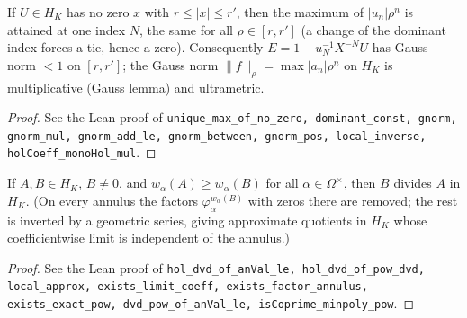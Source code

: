 \begin{lemma}
\label{lem:dominant-annulus}
\leanok
If $U\in H_K$ has no zero $x$ with $r\le|x|\le r'$, then the maximum of $|u_n|\rho^n$ is attained at one index $N$, the same for all $\rho\in[r,r']$ (a change of the dominant index forces a tie, hence a zero). Consequently $E=1-u_N^{-1}X^{-N}U$ has Gauss norm $<1$ on $[r,r']$; the Gauss norm $\|f\|_\rho=\max|a_n|\rho^n$ on $H_K$ is multiplicative (Gauss lemma) and ultrametric.
\end{lemma}
\begin{proof}
\leanok
See the Lean proof of \texttt{unique\_max\_of\_no\_zero, dominant\_const, gnorm, gnorm\_mul, gnorm\_add\_le, gnorm\_between, gnorm\_pos, local\_inverse, holCoeff\_monoHol\_mul}.
\end{proof}

\begin{theorem}
\label{thm:division-hol}
\leanok
If $A,B\in H_K$, $B\ne0$, and $w_\alpha(A)\ge w_\alpha(B)$ for all $\alpha\in\Omega^\times$, then $B$ divides $A$ in $H_K$. (On every annulus the factors $\varphi_\alpha^{w_\alpha(B)}$ with zeros there are removed; the rest is inverted by a geometric series, giving approximate quotients in $H_K$ whose coefficientwise limit is independent of the annulus.)
\end{theorem}
\begin{proof}
\leanok
See the Lean proof of \texttt{hol\_dvd\_of\_anVal\_le, hol\_dvd\_of\_pow\_dvd, local\_approx, exists\_limit\_coeff, exists\_factor\_annulus, exists\_exact\_pow, dvd\_pow\_of\_anVal\_le, isCoprime\_minpoly\_pow}.
\end{proof}

